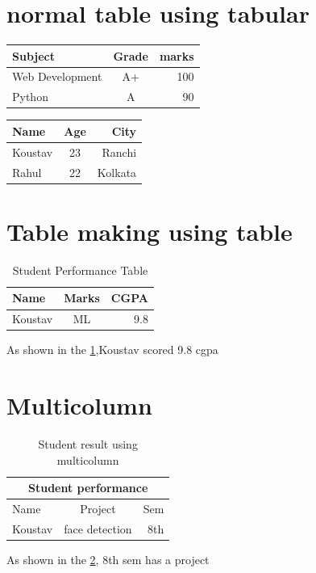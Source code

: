 \documentclass{article}
\begin{document}
	\section{normal table using tabular}
	\begin{center}
	\begin{tabular}{|l|c|r|}
		\hline
		\textbf{Subject}& \textbf{Grade} & \textbf{marks}\\
		\hline
		Web Development & A+ &100\\
		\hline
		Python&A&90\\
		\hline
	\end{tabular}
	\hspace{1cm}
	\begin{tabular}{|l|c|r|}
		\hline
		Name&Age&City\\
		\hline
		Koustav & 23 & Ranchi\\
		\hline
		Rahul &22&Kolkata\\
		\hline
		
	\end{tabular}
		\end{center}
	\section{Table making using table}
	\begin{table}[h]
		\centering
		\caption{Student Performance Table}
		    \vspace{0.3cm}
		\label{tab:marks}
		\begin{tabular}{|l|c|r|}
			\hline
			Name&Marks&CGPA\\
			\hline
			Koustav & ML&9.8\\
			\hline
		\end{tabular}
	\end{table}
	As shown in the \ref{tab:marks},Koustav scored 9.8 cgpa
	
	\section{Multicolumn}
	\begin{table}[h]
		\centering
		\caption{Student result using multicolumn}
		\vspace{0.3cm}
		\label{column}
		\begin{tabular}{|l|c|r|}
			\hline
			\multicolumn{3}{c}{Student performance}\\
			\hline
			Name & Project& Sem\\
			\hline
			Koustav & face detection &8th\\
			\hline
			
		\end{tabular}
		
	\end{table}
	As shown in the \ref{column}, 8th sem has a project
\end{document}
